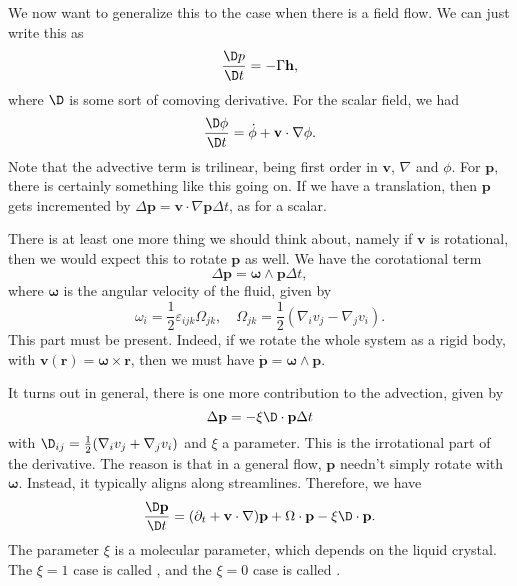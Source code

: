 \documentclass[a4paper]{article}
\begin{document}
We now want to generalize this to the case when there is a field flow. We can just write this as
\[
  \frac{\D p}{\D t} = - \Gamma \mathbf{h},
\]
where $\D$ is some sort of comoving derivative. For the scalar field, we had
\[
  \frac{\D \phi}{\D t} = \dot{\phi} + \mathbf{v} \cdot \nabla \phi.
\]
Note that the advective term is trilinear, being first order in $\mathbf{v}$, $\nabla$ and $\phi$. For $\mathbf{p}$, there is certainly something like this going on. If we have a translation, then $\mathbf{p}$ gets incremented by $\Delta \mathbf{p} = \mathbf{v} \cdot \nabla \mathbf{p} \Delta t$, as for a scalar.

There is at least one more thing we should think about, namely if $\mathbf{v}$ is rotational, then we would expect this to rotate $\mathbf{p}$ as well. We have the corotational term
\[
  \Delta \mathbf{p} = \boldsymbol\omega \wedge \mathbf{p} \Delta t,
\]
where $\boldsymbol\omega$ is the angular velocity of the fluid, given by
\[
  \omega_i = \frac{1}{2} \varepsilon_{ijk} \Omega_{jk},\quad \Omega_{jk} = \frac{1}{2} (\nabla_i v_j - \nabla_j v_i).
\]
This part must be present. Indeed, if we rotate the whole system as a rigid body, with $\mathbf{v}(\mathbf{r}) = \boldsymbol\omega \times \mathbf{r}$, then we must have $\dot{\mathbf{p}} = \boldsymbol\omega \wedge \mathbf{p}$.

It turns out in general, there is one more contribution to the advection, given by
\[
  \Delta \mathbf{p} = - \xi \D \cdot \mathbf{p} \Delta t
\]
with $\D_{ij} = \frac{1}{2} (\nabla_i v_j + \nabla_j v_i)$ and $\xi$ a parameter. This is the irrotational part of the derivative. The reason is that in a general flow, $\mathbf{p}$ needn't simply rotate with $\boldsymbol\omega$. Instead, it typically aligns along streamlines.  Therefore, we have
\[
  \frac{\D \mathbf{p}}{\D t} = (\partial_t + \mathbf{v} \cdot \nabla) \mathbf{p} + \Omega \cdot \mathbf{p} - \xi \D \cdot \mathbf{p}.
\]
The parameter $\xi$ is a molecular parameter, which depends on the liquid crystal. The $\xi = 1$ case is called , and the $\xi = 0$ case is called .
\end{document}
